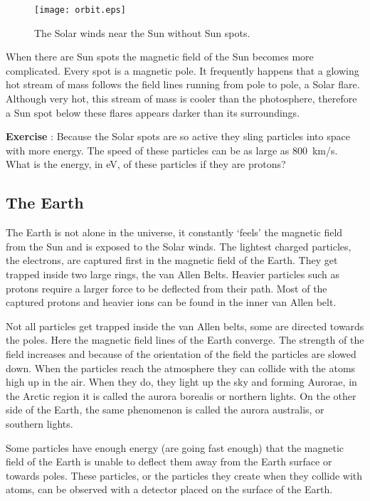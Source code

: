\begin{figure}\begin{center}
\texttt{[image: orbit.eps]}
\caption{The Solar winds near the Sun without Sun spots.} \label{fig:sun_field}
\end{center}\end{figure}

When there are Sun spots the magnetic field of the Sun becomes more complicated. Every spot is a magnetic pole. It frequently happens that a glowing hot stream of mass follows the field lines running from pole to pole, a Solar flare. Although very hot, this stream of mass is cooler than the photosphere, therefore a Sun spot below these flares appears darker than its surroundings.

\begin{shaded}
\textbf{Exercise \theExercise {}} : Because the Solar spots are so active they sling particles into space with more energy. The speed of these particles can be as large as 800~km/s. What is the energy, in eV, of these particles if they are protons?\end{shaded}

\subsection{The Earth}
The Earth is not alone in the universe, it constantly `feels' the magnetic field from the Sun and is exposed to the Solar winds. The lightest charged particles, the electrons, are captured first in the magnetic field of the Earth. They get trapped inside two large rings, the van Allen Belts. Heavier particles such as protons require a larger force to be deflected from their path. Most of the captured protons and heavier ions can be found in the inner van Allen belt.

Not all particles get trapped inside the van Allen belts, some are directed towards the poles. Here the magnetic field lines of the Earth converge. The strength of the field increases and because of the orientation of the field the particles are slowed down. When the particles reach the atmosphere they can collide with the atoms high up in the air. When they do, they light up the sky and forming Aurorae, in the Arctic region it is called the aurora borealis or northern lights. On the other side of the Earth, the same phenomenon is called the aurora australis, or southern lights.

Some particles have enough energy (are going fast enough) that the magnetic field of the Earth is unable to deflect them away from the Earth surface or towards poles. These particles, or the particles they create when they collide with atoms, can be observed with a detector placed on the surface of the Earth.


